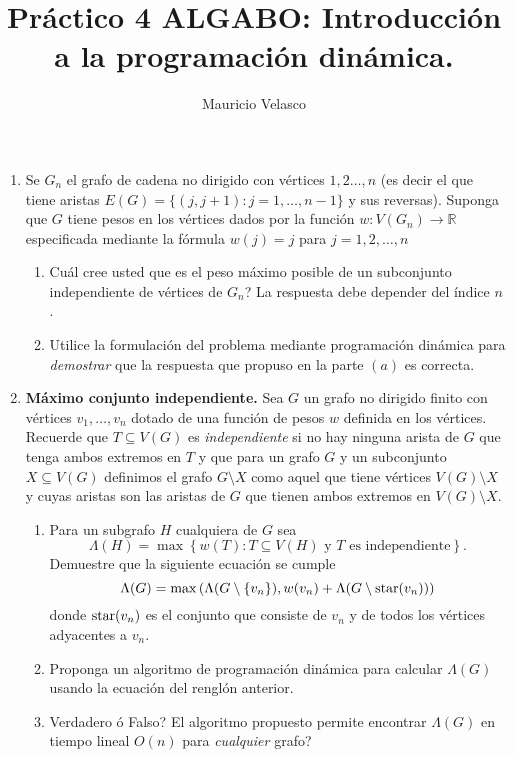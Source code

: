 \documentclass[12pt, a4paper]{article}
\date{}
\begin{document}
\title{Pr\'actico 4 ALGABO: Introducción a la programaci\'on dinámica.}
\author{Mauricio Velasco}
\maketitle{}
\begin{enumerate} 



\item Se $G_n$ el grafo de cadena no dirigido con v\'ertices $1,2\dots, n$ (es decir el que tiene aristas $E(G)=\{(j,j+1): j=1,\dots,n-1 \}$ y sus reversas). Suponga que $G$ tiene pesos en los v\'ertices dados por la funci\'on $w: V(G_n)\rightarrow \mathbb{R}$ especificada mediante la fórmula $w(j)=j$ para $j=1,2,\dots, n$ 
\begin{enumerate}
\item Cuál cree usted que es el peso m\'aximo  posible de un subconjunto independiente de vértices de $G_n$? La respuesta debe depender del \'indice $n$.
\item Utilice la formulaci\'on del problema mediante programaci\'on din\'amica para {\it demostrar} que la respuesta que propuso en la parte $(a)$ es correcta.
\end{enumerate}

\item {\bf M\'aximo conjunto independiente.}  Sea $G$ un grafo no dirigido finito con v\'ertices $v_1,\dots , v_n$ dotado de una funci\'on de pesos $w$ definida en los v\'ertices. Recuerde que $T\subseteq V(G)$ es {\it independiente} si no hay ninguna arista de $G$ que tenga ambos extremos en $T$ y que para un grafo $G$ y un subconjunto $X\subseteq V(G)$ definimos el grafo $G\setminus X$ como aquel que tiene v\'ertices $V(G)\setminus X$ y cuyas aristas son las aristas de $G$ que tienen ambos extremos en $V(G)\setminus X$.
\begin{enumerate}
\item Para un subgrafo $H$ cualquiera de $G$ sea 
\[\Lambda(H)=\max\left\{ w(T): T\subseteq V(H)\text{ y $T$ es independiente}\right\}.\] 
Demuestre que la siguiente ecuaci\'on se cumple 
\[\Lambda(G) = \max\left( \Lambda(G\setminus\{v_n\}), w(v_n) + \Lambda(G\setminus {\rm star}(v_n))\right)\]
donde ${\rm star}(v_n)$ es el conjunto que consiste de $v_n$ y de todos los v\'ertices adyacentes a $v_n$.
\item Proponga un algoritmo de programaci\'on din\'amica para calcular $\Lambda(G)$ usando la ecuaci\'on del rengl\'on anterior.
\item Verdadero \'o Falso? El algoritmo propuesto permite encontrar $\Lambda(G)$ en tiempo lineal $O(n)$ para {\it cualquier} grafo?
\end{enumerate}


\end{enumerate}
\end{document}

